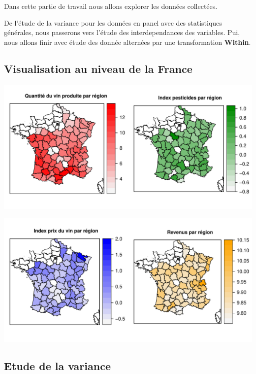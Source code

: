 \documentclass[11pt,]{article}
\begin{document}
\FloatBarrier

Dans cette partie de travail nous allons explorer les données
collectées.

\par

De l'étude de la variance pour les données en panel avec des
statistiques générales, nous passerons vers l'étude des interdependances
des variables. Pui, nous allons finir avec étude des donnée alternées
par une transformation \textbf{Within}.

\hypertarget{visualisation-au-niveau-de-la-france}{%
\subsection{Visualisation au niveau de la
France}\label{visualisation-au-niveau-de-la-france}}

\includegraphics{note2pres_files/figure-latex/unnamed-chunk-16-1.pdf}

\includegraphics{note2pres_files/figure-latex/unnamed-chunk-17-1.pdf}

\hypertarget{etude-de-la-variance}{%
\subsection{Etude de la variance}\label{etude-de-la-variance}}
\end{document}
